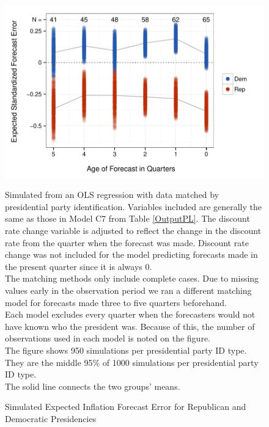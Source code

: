 \documentclass[a4paper]{article}\usepackage{graphicx, color}
\newenvironment{knitrout}{}{} %
\begin{document}
\begin{figure}[t]
    \caption{Simulated Expected Inflation Forecast Error for Republican and Democratic Presidencies}
    \label{ExpectValueParty}
    \begin{center}

\begin{knitrout}
\color{fgcolor}\includegraphics[width=0.75\linewidth]{figure/ExpectValueParty} 
\end{knitrout}



    \end{center}
    \begin{singlespace}
        {\scriptsize{Simulated from an OLS regression with data matched by presidential party identification. Variables included are generally the same as those in Model C7 from Table \ref{OutputPL}. The discount rate change variable is adjusted to reflect the change in the discount rate from the quarter when the forecast was made. Discount rate change was not included for the model predicting forecasts made in the present quarter since it is always 0. \\ The matching methods only include complete cases. Due to missing values early in the observation period we ran a different matching model for forecasts made three to five quarters beforehand. \\ Each model excludes every quarter when the forecasters would not have known who the president was. Because of this, the number of observations used in each model is noted on the figure. \\ The figure shows 950 simulations per presidential party ID type. They are the middle 95\% of 1000 simulations per presidential party ID type. \\ The solid line connects the two groups' means.}}
    \end{singlespace}
\end{figure}
\end{document}
